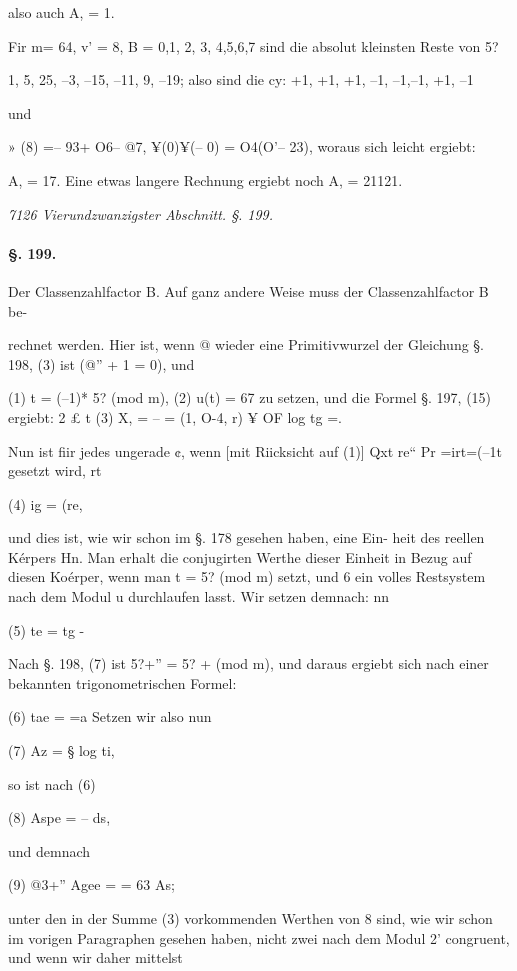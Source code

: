\documentclass[12pt,a4paper]{article}
\theoremstyle{plain}
\theoremstyle{definition}
\begin{document}
also auch A, = 1.

Fir m= 64, v' = 8, B = 0,1, 2, 3, 4,5,6,7 sind die absolut kleinsten Reste von 5?

1, 5, 25, --3, --15, --11, 9, --19; also sind die cy: +1, +1, +1, --1, --1,--1, +1, --1

und

» (8) =-- 93+ O6-- @7, ¥(0)¥(-- 0) = O4(O'-- 23), woraus sich leicht ergiebt:

A, = 17. Eine etwas langere Rechnung ergiebt noch A, = 21121.

\vspace{0.5\baselineskip}\noindent\textit{7126 Vierundzwanzigster Abschnitt. §. 199.}\par

\paragraph{§. 199.}

Der Classenzahlfactor B. Auf ganz andere Weise muss der Classenzahlfactor B be-

rechnet werden. Hier ist, wenn @ wieder eine Primitivwurzel der Gleichung §. 198, (3) ist (@'' + 1 = 0), und

(1) t = (--1)* 5? (mod m), (2) u(t) = 67 zu setzen, und die Formel §. 197, (15) ergiebt: 2 £ t (3) X, = -- = (1, O-4, r) ¥ OF log tg =.

Nun ist fiir jedes ungerade ¢, wenn [mit Riicksicht auf (1)] Qxt re`` Pr =irt=(--1t gesetzt wird, rt

(4) ig = (re,

und dies ist, wie wir schon im §. 178 gesehen haben, eine Ein- heit des reellen Kérpers Hn. Man erhalt die conjugirten Werthe dieser Einheit in Bezug auf diesen Koérper, wenn man t = 5? (mod m) setzt, und 6 ein volles Restsystem nach dem Modul u durchlaufen lasst. Wir setzen demnach: nn

(5) te = tg -

Nach §. 198, (7) ist 5?+'' = 5? + (mod m), und daraus ergiebt sich nach einer bekannten trigonometrischen Formel:

(6) tae = =a Setzen wir also nun

(7) Az = § log ti,

so ist nach (6)

(8) Aspe = -- ds,

und demnach

(9) @3+'' Agee = = 63 As;

unter den in der Summe (3) vorkommenden Werthen von 8 sind, wie wir schon im vorigen Paragraphen gesehen haben, nicht zwei nach dem Modul 2' congruent, und wenn wir daher mittelst
\end{document}
